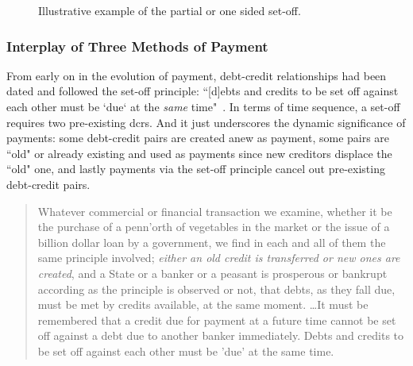 \begin{figure}[!ht]
\caption[Illustrative example of the partial or one sided set-off]%
{Illustrative example of the partial or one sided set-off.}
\label{fig:set-off2}
\vspace{.3in}
\end{figure}

\subsubsection*{Interplay of Three Methods of Payment}

From early on in the evolution of payment, debt-credit relationships had been dated and followed the set-off principle: ``[d]ebts and credits to be set off against each other must be `due` at the \textit{same} time"~\citep[p.~404, emphasis added]{innes1913}. In terms of time sequence, a set-off requires two pre-existing \acfp{dcr}. And it just underscores the dynamic significance of payments: some debt-credit pairs are created anew as payment, some pairs are ``old" or already existing and used as payments since new creditors displace the ``old" one, and lastly payments via the set-off principle cancel out pre-existing debt-credit pairs.      

\begin{quote}
Whatever commercial or financial transaction we examine, whether it
 be the purchase of a penn'orth of vegetables in the market or the issue of a 
billion dollar loan by a government, we find in each and all of them the
 same principle involved; \textit{either an old credit is transferred or new ones are 
created}, and a State or a banker or a peasant is prosperous or bankrupt
 according as the principle is observed or not, that debts, as they fall due,
 must be met by credits available, at the same moment. \dots  It must be
 remembered that a credit due for payment at a future time cannot be set
 off against a debt due to another banker immediately. Debts and credits
 to be set off against each other must be 'due' at the same time.~\citep[p.~404, emphasis added]{innes1913}
\end{quote}

